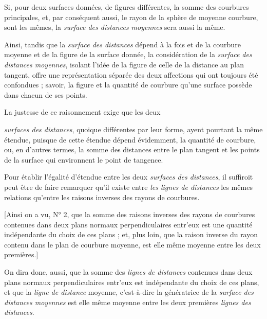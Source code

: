 \documentclass[11pt,a4paper]{article}
\begin{document}
Si, pour deux surfaces données, de figures différentes, la somme des
courbures principales, et, par conséquent aussi, le rayon de la sphère de
moyenne courbure, sont les mêmes, la \emph{surface des distances moyennes}
sera aussi la même.

Ainsi, tandis que la \emph{surface des distances} dépend à la fois et de la
courbure moyenne et de la figure de la surface donnée, la considération de
la \emph{surface des distances moyennes}, isolant l'idée de la figure de
celle de la distance au plan tangent, offre une représentation séparée
 des deux affections qui ont toujours été confondues ;
savoir, la figure et la quantité de courbure qu'une surface possède dans
chacun de ses points.

La justesse de ce raisonnement exige que les deux

\emph{surfaces des distances}, quoique différentes par leur forme, ayent
pourtant la même étendue, puisque de cette étendue dépend évidemment, la
quantité de courbure, ou, en d'autres termes, la somme des distances entre
le plan tangent et les points de la surface qui environnent le point de
tangence.

Pour établir l'égalité d'étendue entre les deux \emph{surfaces des
distances}, il suffiroit peut être de faire remarquer qu'il existe entre
\emph{les lignes de distances} les mêmes relations qu'entre les raisons
inverses des rayons de courbures.


[Ainsi on a vu, N° 2, que la somme des raisons inverses des rayons de
courbures contenues dans deux plans normaux perpendiculaires entr'eux est
une quantité indépendante du choix de ces plans ; et, plus loin, que la
raison inverse du rayon contenu dans le plan de courbure moyenne, est elle
même moyenne entre les deux premières.]

On dira donc, aussi, que la somme des \emph{lignes de distances} contenues
dans deux plans normaux perpendiculaires entr'eux est indépendante du choix
de ces plans, et que la \emph{ligne de distance} moyenne, c'est-à-dire la
génératrice de la \emph{surface des distances moyennes} est elle même
moyenne entre les deux premières \emph{lignes des distances}.

\end{document}
